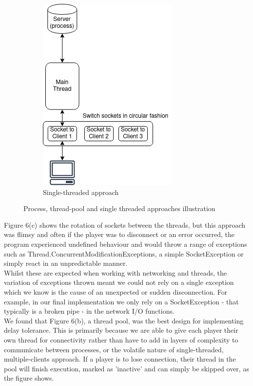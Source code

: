 \documentclass[11pt]{article}
\begin{document}
\begin{figure}[h]
{	\begin{subfigure}[h]{0.3\paperwidth}
	\hspace{10pt}
		\includegraphics[height=\fh]{approach_single}
		\caption{Single-threaded approach}
	\end{subfigure}	
	}
	
	\caption{Process, thread-pool and single threaded approaches illustration}
	
\end{figure}





Figure 6(c) shows the rotation of sockets between the threads, but this approach was flimsy and often if the player was to disconnect or an error occurred, the program experienced undefined behaviour and would throw a range of exceptions such as Thread.ConcurrentModificationExceptions, a simple SocketException or simply react in an unpredictable manner. \\

Whilst these are expected when working with networking and threads, the variation of exceptions thrown meant we could not rely on a single exception which we know is the cause of an unexpected or sudden disconnection. For example, in our final implementation we only rely on a SocketException - that typically is a broken pipe - in the network I/O functions. \\

We found that Figure 6(b), a thread pool, was the best design for implementing delay tolerance. This is primarily because we are able to give each player their own thread for connectivity rather than have to add in layers of complexity to communicate between processes, or the volatile nature of single-threaded, multiple-clients approach. If a player is to lose connection, their thread in the pool will finish execution, marked as 'inactive' and can simply be skipped over, as the figure shows. 
\end{document}
